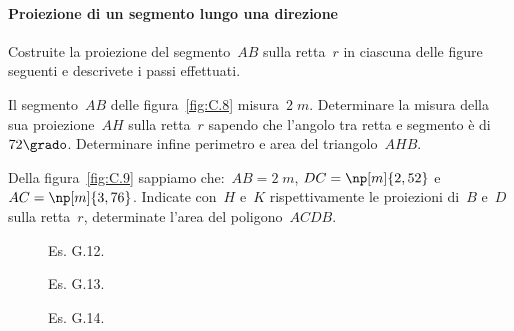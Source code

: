 \paragraph{Proiezione di un segmento lungo una direzione}
\begin{esercizio}
\label{ese:C.11}
Costruite la proiezione del segmento~$AB$ sulla retta~$r$ in ciascuna delle figure seguenti e descrivete i passi effettuati.
\begin{center}
 
\end{center}
\end{esercizio}

\begin{multicols}{2}
 \begin{esercizio}
\label{ese:C.12}
Il segmento~$AB$ delle figura~\ref{fig:C.8} misura~$2\;\unit{m}$. Determinare la misura della sua proiezione~$AH$ sulla retta~$r$ sapendo che l'angolo tra retta e
segmento è di~$72\grado$. Determinare infine perimetro e area del triangolo~$AHB$.
\end{esercizio}
\begin{esercizio}
\label{ese:C.13}
Della figura~\ref{fig:C.9} sappiamo che:~${AB}=2\;\unit{m}$, ${DC}=\np[m]{2,52}$ e ${AC}=\np[m]{3,76}$.
Indicate con~$H$ e~$K$ rispettivamente le proiezioni di~$B$ e~$D$ sulla retta~$r$, determinate l'area del poligono~$ACDB$.
\end{esercizio}
\end{multicols}

\begin{figure}[t]
 \begin{minipage}[t]{.25\textwidth}
 \centering
 
 \caption{Es. G.12.}\label{fig:C.8}
 \end{minipage}
 \begin{minipage}[t]{.45\textwidth}
 \centering
 
 \caption{Es. G.13.}\label{fig:C.9}
 \end{minipage}
 \begin{minipage}[t]{.25\textwidth}
 \centering
 
 \caption{Es. G.14.}\label{fig:C.10}
 \end{minipage}
\end{figure}

